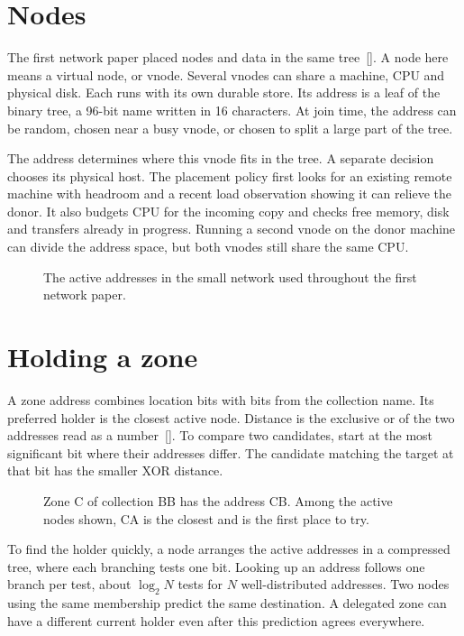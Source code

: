 \documentclass[11pt]{article}
\begin{document}
\section{Nodes}
The first network paper placed nodes and data in the same tree~[]. A node here means a virtual node, or vnode. Several vnodes can share a machine, CPU and physical disk. Each runs with its own durable store. Its address is a leaf of the binary tree, a 96-bit name written in 16 characters. At join time, the address can be random, chosen near a busy vnode, or chosen to split a large part of the tree.

The address determines where this vnode fits in the tree. A separate decision chooses its physical host. The placement policy first looks for an existing remote machine with headroom and a recent load observation showing it can relieve the donor. It also budgets CPU for the incoming copy and checks free memory, disk and transfers already in progress. Running a second vnode on the donor machine can divide the address space, but both vnodes still share the same CPU.

\begin{figure}[H]
    \centering
    \caption{The active addresses in the small network used throughout the first network paper.}
\end{figure}

\section{Holding a zone}
A zone address combines location bits with bits from the collection name. Its preferred holder is the closest active node. Distance is the exclusive or of the two addresses read as a number~[]. To compare two candidates, start at the most significant bit where their addresses differ. The candidate matching the target at that bit has the smaller XOR distance.

\begin{figure}[H]
    \centering
    \caption{Zone C of collection BB has the address CB. Among the active nodes shown, CA is the closest and is the first place to try.}
\end{figure}

To find the holder quickly, a node arranges the active addresses in a compressed tree, where each branching tests one bit. Looking up an address follows one branch per test, about $\log_2 N$ tests for $N$ well-distributed addresses. Two nodes using the same membership predict the same destination. A delegated zone can have a different current holder even after this prediction agrees everywhere.
\end{document}
